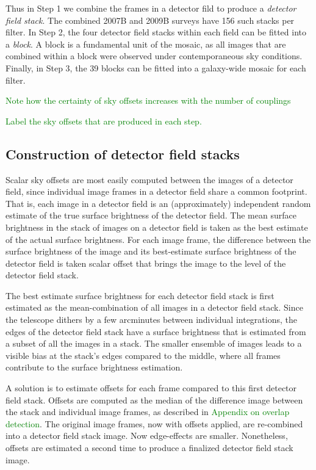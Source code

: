 \documentclass[iop]{emulateapj}
\newcommand{\todo}[1]{\textcolor{green}{#1}} %
\begin{document}
Thus in Step 1 we combine the frames in a detector fild to produce a \emph{detector field stack}. The combined 2007B and 2009B surveys have 156 such stacks per filter. In Step 2, the four detector field stacks within each field can be fitted into a \emph{block}. A block is a fundamental unit of the mosaic, as all images that are combined within a block were observed under contemporaneous sky conditions. Finally, in Step 3, the 39 blocks can be fitted into a galaxy-wide mosaic for each filter.

\todo{Note how the certainty of sky offsets increases with the number of couplings}

\todo{Label the sky offsets that are produced in each step.}

\subsection{Construction of detector field stacks}
\label{sec:stacks}

Scalar sky offsets are most easily computed between the images of a detector field, since individual image frames in a detector field share a common footprint. That is, each image in a detector field is an (approximately) independent random estimate of the true surface brightness of the detector field. The mean surface brightness in the stack of images on a detector field is taken as the best estimate of the actual surface brightness. For each image frame, the difference between the surface brightness of the image and its best-estimate surface brightness of the detector field is taken scalar offset that brings the image to the level of the detector field stack.

The best estimate surface brightness for each detector field stack is first estimated as the mean-combination of all images in a detector field stack.  Since the telescope dithers by a few arcminutes between individual integrations, the edges of the detector field stack have a surface brightness that is estimated from a subset of all the images in a stack. The smaller ensemble of images leads to a visible bias at the stack's edges compared to the middle, where all frames contribute to the surface brightness estimation.

A solution is to estimate offsets for each frame compared to this first detector field stack. Offsets are computed as the median of the difference image between the stack and individual image frames, as described in \todo{Appendix on overlap detection}. The original image frames, now with offsets applied, are re-combined into a detector field stack image. Now edge-effects are smaller. Nonetheless, offsets are estimated a second time to produce a finalized detector field stack image.
\end{document}
